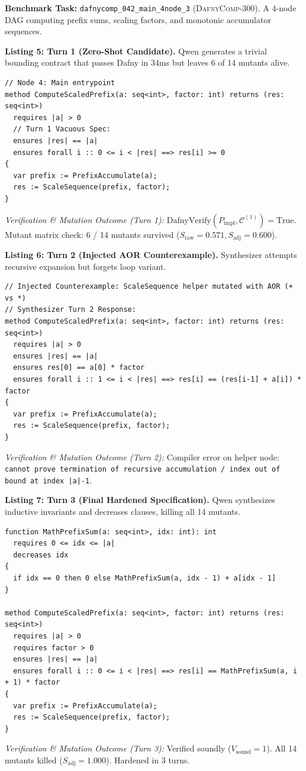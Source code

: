 \documentclass{article}
\begin{document}
\textbf{Benchmark Task:} \texttt{dafnycomp\_042\_main\_4node\_3} (\textsc{DafnyComp-300}). A 4-node DAG computing prefix sums, scaling factors, and monotonic accumulator sequences.

\vspace{0.3em}
\noindent\textbf{Listing 5: Turn 1 (Zero-Shot Candidate).} Qwen generates a trivial bounding contract that passes Dafny in 34ms but leaves 6 of 14 mutants alive.
{\footnotesize
\begin{verbatim}
// Node 4: Main entrypoint
method ComputeScaledPrefix(a: seq<int>, factor: int) returns (res: seq<int>)
  requires |a| > 0
  // Turn 1 Vacuous Spec:
  ensures |res| == |a|
  ensures forall i :: 0 <= i < |res| ==> res[i] >= 0
{
  var prefix := PrefixAccumulate(a);
  res := ScaleSequence(prefix, factor);
}
\end{verbatim}
}
\textit{Verification \& Mutation Outcome (Turn 1):} $\text{DafnyVerify}(P_{\text{impl}}, \mathcal{C}^{(1)}) = \text{True}$. Mutant matrix check: 6 / 14 mutants survived ($S_{\text{raw}} = 0.571, S_{\text{adj}} = 0.600$).

\vspace{0.3em}
\noindent\textbf{Listing 6: Turn 2 (Injected AOR Counterexample).} Synthesizer attempts recursive expansion but forgets loop variant.
{\footnotesize
\begin{verbatim}
// Injected Counterexample: ScaleSequence helper mutated with AOR (+ vs *)
// Synthesizer Turn 2 Response:
method ComputeScaledPrefix(a: seq<int>, factor: int) returns (res: seq<int>)
  requires |a| > 0
  ensures |res| == |a|
  ensures res[0] == a[0] * factor
  ensures forall i :: 1 <= i < |res| ==> res[i] == (res[i-1] + a[i]) * factor
{
  var prefix := PrefixAccumulate(a);
  res := ScaleSequence(prefix, factor);
}
\end{verbatim}
}
\textit{Verification \& Mutation Outcome (Turn 2):} Compiler error on helper node: \texttt{cannot prove termination of recursive accumulation / index out of bound at index |a|-1}.

\vspace{0.3em}
\noindent\textbf{Listing 7: Turn 3 (Final Hardened Specification).} Qwen synthesizes inductive invariants and decreases clauses, killing all 14 mutants.
{\footnotesize
\begin{verbatim}
function MathPrefixSum(a: seq<int>, idx: int): int
  requires 0 <= idx <= |a|
  decreases idx
{
  if idx == 0 then 0 else MathPrefixSum(a, idx - 1) + a[idx - 1]
}

method ComputeScaledPrefix(a: seq<int>, factor: int) returns (res: seq<int>)
  requires |a| > 0
  requires factor > 0
  ensures |res| == |a|
  ensures forall i :: 0 <= i < |res| ==> res[i] == MathPrefixSum(a, i + 1) * factor
{
  var prefix := PrefixAccumulate(a);
  res := ScaleSequence(prefix, factor);
}
\end{verbatim}
}
\textit{Verification \& Mutation Outcome (Turn 3):} Verified soundly ($V_{\text{sound}} = 1$). All 14 mutants killed ($S_{\text{adj}} = 1.000$). Hardened in 3 turns.
\end{document}
